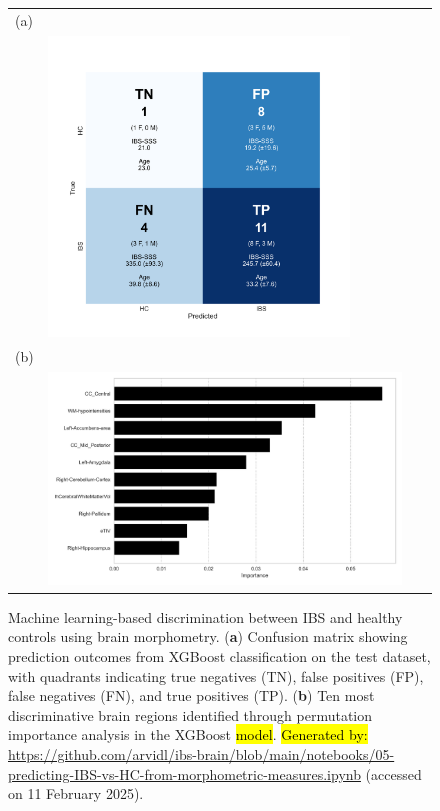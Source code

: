 \documentclass[diagnostics,article,accept,pdftex,moreauthors]{Definitions/mdpi}
\begin{document}
\begin{figure}[H]
\begin{tabular}{ll}
(a) &   \\
  & \includegraphics[width=0.80\textwidth]{figs/annotated_xgboost_confusion_matrix_using_ASEG.png} \\
(b) &  \\
   &  \includegraphics[width=0.94\textwidth]{figs/Top_10_Feature_Importances_permutation_importance_brain_morphometry.png}\\
\end{tabular}
\caption{{{Machine learning-based discrimination between IBS and healthy controls using brain morphometry}}. (\textbf{a}) Confusion matrix showing prediction outcomes from XGBoost classification on the test dataset, with quadrants indicating true negatives (TN), false positives (FP), false negatives (FN), and true positives (TP). (\textbf{b}) Ten most discriminative brain regions identified through permutation importance analysis in the XGBoost \hl{model}. %
{\hl{Generated by:} {{ \url{https://github.com/arvidl/ibs-brain/blob/main/notebooks/05-predicting-IBS-vs-HC-from-morphometric-measures.ipynb}}}} (accessed on 11 February 2025).}
\label{fig:confusion-matrix-xgboost}
\end{figure} 
\end{document}
